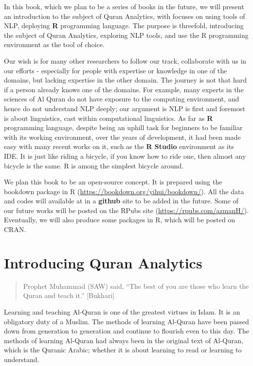 \documentclass[
]{article}
\begin{document}
In this book, which we plan to be a series of books in the future, we will present an introduction to the subject of Quran Analytics, with focuses on using tools of NLP, deploying \textbf{R} programming language. The purpose is threefold, introducing the subject of Quran Analytics, exploring NLP tools, and use the R programming environment as the tool of choice.

Our wish is for many other researchers to follow our track, collaborate with us in our efforts - especially for people with expertise or knowledge in one of the domains, but lacking expertise in the other domain. The journey is not that hard if a person already knows one of the domains. For example, many experts in the sciences of Al Quran do not have exposure to the computing environment, and hence do not understand NLP deeply; our argument is NLP is first and foremost is about linguistics, cast within computational linguistics. As far as \textbf{R} programming language, despite being an uphill task for beginners to be familiar with its working environment, over the years of development, it had been made easy with many recent works on it, such as the \textbf{R Studio} environment as its IDE. It is just like riding a bicycle, if you know how to ride one, then almost any bicycle is the same. R is among the simplest bicycle around.

We plan this book to be an open-source concept. It is prepared using the bookdown package in R (\url{https://bookdown.org/yihui/bookdown/}). All the data and codes will available at in a \textbf{github} site to be added in the future. Some of our future works will be posted on the RPubs site (\url{https://rpubs.com/azmanH/}). Eventually, we will also produce some packages in R, which will be posted on CRAN.

\hypertarget{introducing-quran-analytics}{%
\section{Introducing Quran Analytics}\label{introducing-quran-analytics}}

\begin{quote}
Prophet Muhammad (SAW) said, ``The best of you are those who learn the Quran and teach it.'' {[}Bukhari{]}
\end{quote}

Learning and teaching Al-Quran is one of the greatest virtues in Islam. It is an obligatory duty of a Muslim. The methods of learning Al-Quran have been passed down from generation to generation and continue to flourish even to this day. The methods of learning Al-Quran had always been in the original text of Al-Quran, which is the Quranic Arabic; whether it is about learning to read or learning to understand.
\end{document}
